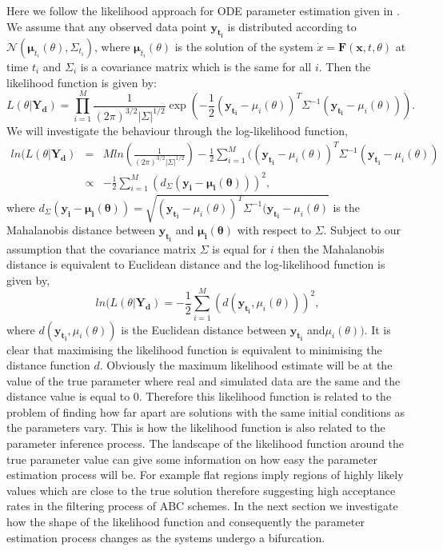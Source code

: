 Here we follow the likelihood approach for ODE parameter estimation given in \cite{}. We assume that any observed data point $\mathbf{y_{t_i}}$ is distributed according to $\mathcal{N}(\boldsymbol{\mu}_{t_i}(\theta), \Sigma_{t_i})$, where $\boldsymbol{\mu}_{t_i}(\theta)$ is the solution of the system $\dot x = \mathbf{F}(\mathbf{x}, t, \theta)$ at time $t_i$ and $\Sigma_i$ is a covariance matrix which is the same for all $i$. Then the likelihood function is given by:
\begin{equation}
L(\theta | \mathbf{Y_d}) = \prod_{i=1}^M \frac{1}{(2\pi)^{3/2}|\Sigma|^{1/2}} \exp \left(-\frac{1}{2}(\mathbf{y_{t_i}} - \mu_i(\theta))^{T}\Sigma^{-1}(\mathbf{y_{t_i}} - \mu_i(\theta)) \right).
\end{equation}
We will investigate the behaviour through the log-likelihood function,
\begin{equation}
\begin{array}{lcl}
ln(L(\theta|\mathbf{Y_d}) &= & M ln\left(\frac{1}{(2\pi)^{3/2}|\Sigma|^{1/2}}\right) -\frac{1}{2}\sum_{i=1}^{M}((\mathbf{y_{t_i}} - \mu_i(\theta))^{T}\Sigma^{-1}(\mathbf{y_{t_i}} - \mu_i(\theta))\\
& \propto & -\frac{1}{2}\sum_{i=1}^{M}(d_{\Sigma}(\mathbf{y_i} - \boldsymbol{\mu_i(\theta)}))^2,
\end{array}
\end{equation}
where $d_{\Sigma}(\mathbf{y_i} - \boldsymbol{\mu_i(\theta)}) = \sqrt{(\mathbf{y_{t_i}} - \mu_i(\theta))^{T}\Sigma^{-1}(\mathbf{y_{t_i}} - \mu_i(\theta)}$ is the Mahalanobis distance between $\mathbf{y_{t_i}}$ and $\boldsymbol{\mu_i(\theta)}$ with respect to $\Sigma$.  Subject to our assumption that the covariance matrix $\Sigma$ is equal for $i$ then the Mahalanobis distance is equivalent to Euclidean distance and the log-likelihood function is given by,
\begin{equation}
ln(L(\theta|\mathbf{Y_d}) = -\frac{1}{2}\sum_{i=1}^{M}(d(\mathbf{y_{t_i}}, \mu_{i}(\theta)))^2,
\end{equation}
where $d(\mathbf{y_{t_i}}, \mu_{i}(\theta))$ is the Euclidean distance between $\mathbf{y_{t_i}}$ and$\mu_{i}(\theta))$. It is clear that maximising the 
likelihood function is equivalent to minimising the distance function $d$. Obviously the maximum likelihood estimate will be at the value of the true parameter where real and simulated data are the same and the distance value is equal to $0$. Therefore this likelihood function is related to the problem of finding how far apart are solutions with the same initial conditions as the parameters vary. This is how the likelihood function is also related to the parameter inference process. The landscape of the likelihood function around the true parameter value can give some information on how easy the parameter estimation process will be. For example flat regions imply regions of highly likely values which are close to the true solution therefore suggesting high acceptance rates in the filtering process of ABC schemes. In the next section we investigate how the shape of the likelihood function and consequently the parameter estimation process changes as the systems undergo a bifurcation.

